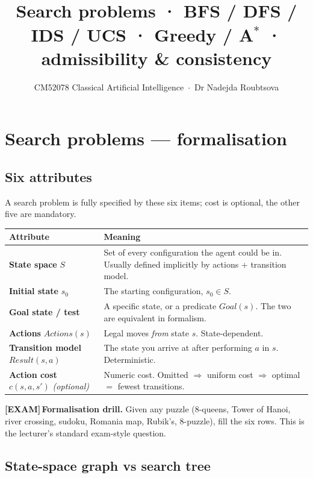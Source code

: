\documentclass[11pt, a4paper]{article}
\title{\vspace{-1.5cm}{\Huge\bfseries Week 2 — Informed and Uninformed Search} \\[0.3em]{\large Search problems · BFS / DFS / IDS / UCS · Greedy / A$^{*}$ · admissibility \& consistency}}
\author{\large CM52078 Classical Artificial Intelligence \,$\cdot$\, Dr Nadejda Roubtsova}
\date{}
\newcommand{\thead}[1]{\textbf{#1}}
\newcommand{\examflag}{\textcolor{tipBd}{\textbf{[EXAM]}}\,}
\begin{document}
\maketitle
\thispagestyle{empty}
\vspace{-1em}

\section{Search problems — formalisation}

\subsection{Six attributes}

A search problem is fully specified by these six items; cost is optional, the other five are mandatory.

\begin{center}
\renewcommand{\arraystretch}{1.2}
\begin{tabularx}{\textwidth}{@{}p{3.3cm}X@{}}
\toprule
\thead{Attribute} & \thead{Meaning} \\
\midrule
\textbf{State space} $S$ & Set of every configuration the agent could be in. Usually defined implicitly by actions + transition model. \\
\textbf{Initial state} $s_0$ & The starting configuration, $s_0 \in S$. \\
\textbf{Goal state / test} & A specific state, or a predicate $Goal(s)$. The two are equivalent in formalism. \\
\textbf{Actions} $Actions(s)$ & Legal moves \emph{from} state $s$. State-dependent. \\
\textbf{Transition model} $Result(s,a)$ & The state you arrive at after performing $a$ in $s$. Deterministic. \\
\textbf{Action cost} $c(s,a,s')$ \emph{(optional)} & Numeric cost. Omitted $\Rightarrow$ uniform cost $\Rightarrow$ optimal $=$ fewest transitions. \\
\bottomrule
\end{tabularx}
\end{center}

\examflag{}\textbf{Formalisation drill.} Given any puzzle (8-queens, Tower of Hanoi, river crossing, sudoku, Romania map, Rubik's, 8-puzzle), fill the six rows. This is the lecturer's standard exam-style question.

\subsection{State-space graph vs search tree}
\end{document}
